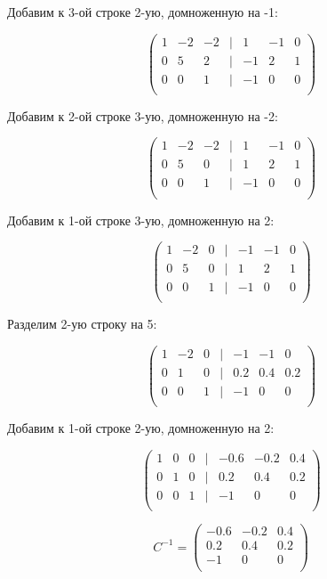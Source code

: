	Добавим к 3-ой строке 2-ую, домноженную на -1:
	
	\[
	\begin{pmatrix}
	1 & -2 & -2 & | & 1 & -1 & 0 \\
	0 & 5 & 2 & | & -1 & 2 & 1 \\
	0 & 0 & 1 & | & -1 & 0 & 0 \\
	\end{pmatrix}
	\]
	
	Добавим к 2-ой строке 3-ую, домноженную на -2:
	
	\[
	\begin{pmatrix}
	1 & -2 & -2 & | & 1 & -1 & 0 \\
	0 & 5 & 0 & | & 1 & 2 & 1 \\
	0 & 0 & 1 & | & -1 & 0 & 0 \\
	\end{pmatrix}
	\]
	
	Добавим к 1-ой строке 3-ую, домноженную на 2:
	
	\[
	\begin{pmatrix}
	1 & -2 & 0 & | & -1 & -1 & 0 \\
	0 & 5 & 0 & | & 1 & 2 & 1 \\
	0 & 0 & 1 & | & -1 & 0 & 0 \\
	\end{pmatrix}
	\]
	
	Разделим 2-ую строку на 5:
	
	\[
	\begin{pmatrix}
	1 & -2 & 0 & | & -1 & -1 & 0 \\
	0 & 1 & 0 & | & 0.2 & 0.4 & 0.2 \\
	0 & 0 & 1 & | & -1 & 0 & 0 \\
	\end{pmatrix}
	\]
	
	Добавим к 1-ой строке 2-ую, домноженную на 2:
	
	\[
	\begin{pmatrix}
	1 & 0 & 0 & | & -0.6 & -0.2 & 0.4 \\
	0 & 1 & 0 & | & 0.2 & 0.4 & 0.2 \\
	0 & 0 & 1 & | & -1 & 0 & 0 \\
	\end{pmatrix}
	\]
	
	\[ C^{-1} = 
	\begin{pmatrix}
	-0.6 & -0.2 & 0.4 \\
	0.2 & 0.4 & 0.2 \\
	-1 & 0 & 0 \\
	\end{pmatrix}
	\]
	
